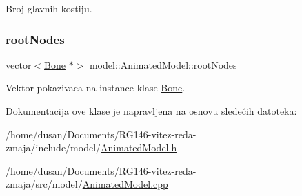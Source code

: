 Broj glavnih kostiju. 

\mbox{\label{classmodel_1_1AnimatedModel_a26c1309582cde31ac4dfb8e2436a0cd7}} 
\subsubsection{\texorpdfstring{root\+Nodes}{rootNodes}}
{\footnotesize\ttfamily vector$<$\hyperlink{classmodel_1_1Bone}{Bone} $\ast$$>$ model\+::\+Animated\+Model\+::root\+Nodes\hspace{0.3cm}{\ttfamily [private]}}



Vektor pokazivaca na instance klase \hyperlink{classmodel_1_1Bone}{Bone}. 



Dokumentacija ove klase je napravljena na osnovu sledećih datoteka\+:\begin{DoxyCompactItemize}
\item 
/home/dusan/\+Documents/\+R\+G146-\/vitez-\/reda-\/zmaja/include/model/\hyperlink{AnimatedModel_8h}{Animated\+Model.\+h}\item 
/home/dusan/\+Documents/\+R\+G146-\/vitez-\/reda-\/zmaja/src/model/\hyperlink{AnimatedModel_8cpp}{Animated\+Model.\+cpp}\end{DoxyCompactItemize}
